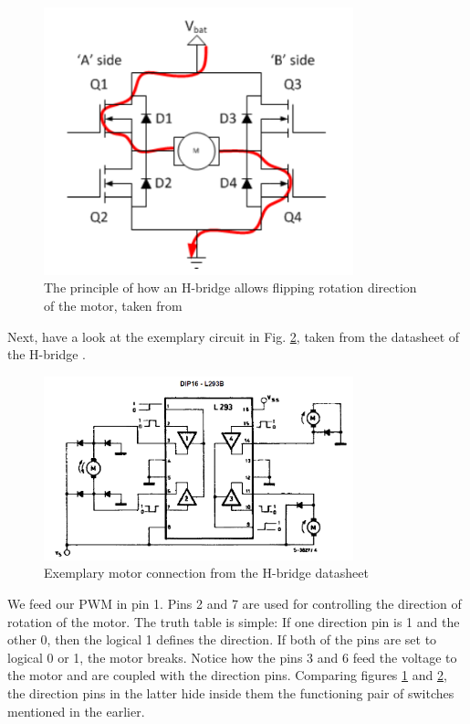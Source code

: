 \begin{figure}[htb]
    \centering
    \includegraphics[width=0.8\textwidth]{figures/hardware/H-Principle.PNG}
    \caption{The principle of how an H-bridge allows flipping rotation direction of the motor, taken from \cite{catchDiodes}}
    \label{fig:HPrinciple}
\end{figure}

Next, have a look at the exemplary circuit in Fig. \ref{fig:HData}, taken from the datasheet of the H-bridge \cite{Hbridge}.

\begin{figure}[htb]
    \centering
    \includegraphics[width=0.8\textwidth]{figures/hardware/HbridgeDatasheet.PNG}
    \caption{Exemplary motor connection from the H-bridge datasheet}
    \label{fig:HData}
\end{figure}

\FloatBarrier

We feed our PWM in pin 1. Pins 2 and 7 are used for controlling the direction of rotation of the motor. The truth table is simple: If one direction pin is 1 and the other 0, then the logical 1 defines the direction. If both of the pins are set to logical 0 or 1, the motor breaks. Notice how the pins 3 and 6 feed the voltage to the motor and are coupled with the direction pins. Comparing figures \ref{fig:HPrinciple} and \ref{fig:HData}, the direction pins in the latter hide inside them the functioning pair of switches mentioned in the earlier.

